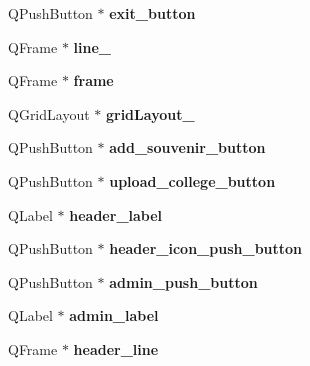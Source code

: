 \begin{DoxyCompactItemize}
Q\+Push\+Button $\ast$ {\bfseries exit\+\_\+button}
\item 
\mbox{\label{class_ui___main_window_a17207206e55a605ecc14a3534b7e575f}} 
Q\+Frame $\ast$ {\bfseries line\+\_}
\item 
\mbox{\label{class_ui___main_window_ad01968740c435709a8b2ec4c08094c67}} 
Q\+Frame $\ast$ {\bfseries frame}
\item 
\mbox{\label{class_ui___main_window_a6b2a0c5f7e8ff2a87134908dd770d2d2}} 
Q\+Grid\+Layout $\ast$ {\bfseries grid\+Layout\+\_}
\item 
\mbox{\label{class_ui___main_window_af13749cb2b165e2f3ba8b7bd00b147f0}} 
Q\+Push\+Button $\ast$ {\bfseries add\+\_\+souvenir\+\_\+button}
\item 
\mbox{\label{class_ui___main_window_a6070a3cacbf1c312b60b98890956793a}} 
Q\+Push\+Button $\ast$ {\bfseries upload\+\_\+college\+\_\+button}
\item 
\mbox{\label{class_ui___main_window_ac9787d5b5c982f33216bba1199894d68}} 
Q\+Label $\ast$ {\bfseries header\+\_\+label}
\item 
\mbox{\label{class_ui___main_window_a90431db020b6a6b931d7170a538c8002}} 
Q\+Push\+Button $\ast$ {\bfseries header\+\_\+icon\+\_\+push\+\_\+button}
\item 
\mbox{\label{class_ui___main_window_a7835addb33294b225483cf76825365a8}} 
Q\+Push\+Button $\ast$ {\bfseries admin\+\_\+push\+\_\+button}
\item 
\mbox{\label{class_ui___main_window_aef012e34567cf1c9317a2560adef17b5}} 
Q\+Label $\ast$ {\bfseries admin\+\_\+label}
\item 
\mbox{\label{class_ui___main_window_a3039ec67b5f2d9e4e0e30f1f94323690}} 
Q\+Frame $\ast$ {\bfseries header\+\_\+line}
\item 
\mbox{\label{class_ui___main_window_ab96ab0f0578098521fa69a75aa5cdde8}} 

\end{DoxyCompactItemize}
